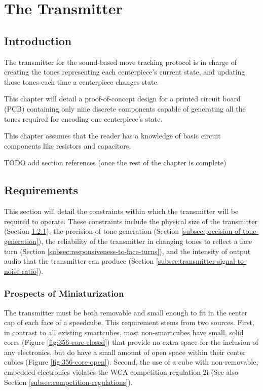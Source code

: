 
\chapter{The Transmitter} %
\label{Chapter6} 


\section{Introduction}

The transmitter for the sound-based move tracking protocol is in charge
of creating the tones representing each centerpiece's current state,
and updating those tones each time a centerpiece changes state.

This chapter will detail a proof-of-concept design for a printed
circuit board (PCB) containing only nine discrete components capable of
generating all the tones required for encoding one centerpiece's state.

This chapter assumes that the reader has a knowledge of basic circuit
components like resistors and capacitors.

TODO add section references (once the rest of the chapter is complete)

\section{Requirements}
\label{sec:transmitter-requirements}

This section will detail the constraints within which the transmitter
will be required to operate. These constraints include the physical
size of the transmitter (Section
\ref{subsec:prospects-of-miniaturization}), the precision of tone
generation (Section \ref{subsec:precision-of-tone-generation}), the
reliability of the transmitter in changing tones to reflect a face turn
(Section \ref{subsec:responsiveness-to-face-turns}), and the intensity
of output audio that the transmitter can produce (Section
\ref{subsec:transmitter-signal-to-noise-ratio}).

\subsection{Prospects of Miniaturization}
\label{subsec:prospects-of-miniaturization}

The transmitter must be both removable and small enough to fit in the
center cap of each face of a speedcube. This requirement stems from two
sources. First, in contrast to all existing smartcubes, most
non-smartcubes have small, solid cores (Figure
\ref{fig:356-core-closed}) that provide no extra space for the
inclusion of any electronics, but do have a small amount of open space
within their center cubies (Figure \ref{fig:356-core-open}). Second,
the use of a cube with non-removable, embedded electronics violates the
WCA competition regulation 2i \cite{wca-regulations} (See also Section
\ref{subsec:competition-regulations}).

